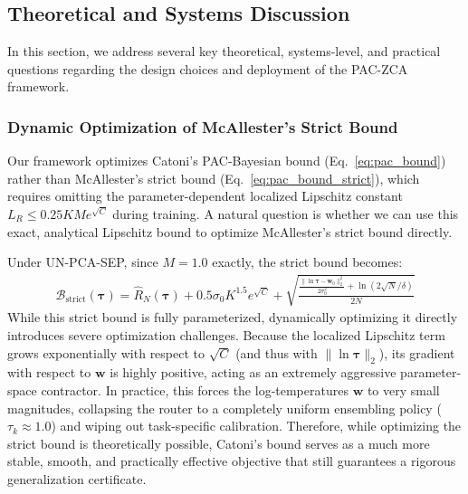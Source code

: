 \subsection{Theoretical and Systems Discussion}
In this section, we address several key theoretical, systems-level, and practical questions regarding the design choices and deployment of the PAC-ZCA framework.

\subsubsection{Dynamic Optimization of McAllester's Strict Bound}
Our framework optimizes Catoni's PAC-Bayesian bound (Eq.~\eqref{eq:pac_bound}) rather than McAllester's strict bound (Eq.~\eqref{eq:pac_bound_strict}), which requires omitting the parameter-dependent localized Lipschitz constant $L_R \le 0.25 K M e^{\sqrt{C}}$ during training. A natural question is whether we can use this exact, analytical Lipschitz bound to optimize McAllester's strict bound directly. 

Under UN-PCA-SEP, since $M=1.0$ exactly, the strict bound becomes:
\begin{align}
    \mathcal{B}_{\text{strict}}(\boldsymbol{\tau}) = \hat{R}_N(\boldsymbol{\tau}) + 0.5 \sigma_0 K^{1.5} e^{\sqrt{C}} + \sqrt{\frac{\frac{\|\ln \boldsymbol{\tau} - \mathbf{w}_0\|_2^2}{2 \sigma_0^2} + \ln(2\sqrt{N}/\delta)}{2N}}
\end{align}
While this strict bound is fully parameterized, dynamically optimizing it directly introduces severe optimization challenges. Because the localized Lipschitz term grows exponentially with respect to $\sqrt{C}$ (and thus with $\|\ln \boldsymbol{\tau}\|_2$), its gradient with respect to $\mathbf{w}$ is highly positive, acting as an extremely aggressive parameter-space contractor. In practice, this forces the log-temperatures $\mathbf{w}$ to very small magnitudes, collapsing the router to a completely uniform ensembling policy ($\tau_k \approx 1.0$) and wiping out task-specific calibration. Therefore, while optimizing the strict bound is theoretically possible, Catoni's bound serves as a much more stable, smooth, and practically effective objective that still guarantees a rigorous generalization certificate.


